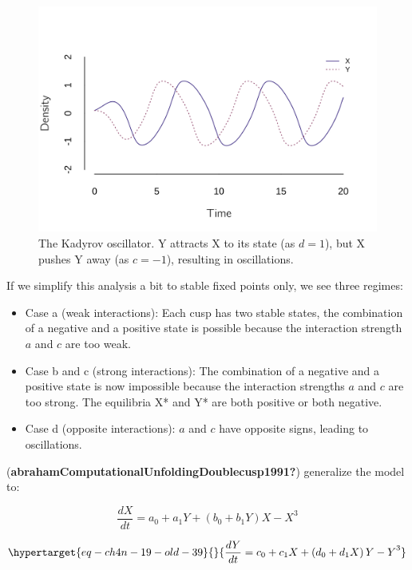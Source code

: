 \documentclass[
  a4paper,
  DIV=11,
  numbers=noendperiod,
  oneside]{scrreprt}
\begin{document}
\begin{figure}

{\centering \includegraphics{media/ch4n/fig-ch4n-img17-old-65.png}

}

\caption{\label{fig-ch4n-img17-old-65}The Kadyrov oscillator. Y attracts
X to its state (as \(d = 1\)), but X pushes Y away (as \(c = - 1\)),
resulting in oscillations.}

\end{figure}

If we simplify this analysis a bit to stable fixed points only, we see
three regimes:

\begin{itemize}
\item
  Case a (weak interactions): Each cusp has two stable states, the
  combination of a negative and a positive state is possible because the
  interaction strength \(a\) and \(c\) are too weak.
\item
  Case b and c (strong interactions): The combination of a negative and
  a positive state is now impossible because the interaction strengths
  \(a\) and \(c\) are too strong. The equilibria X* and Y* are both
  positive or both negative.
\item
  Case d (opposite interactions): \(a\) and \(c\) have opposite signs,
  leading to oscillations.
\end{itemize}

(\textbf{abrahamComputationalUnfoldingDoublecusp1991?}) generalize the
model to:

\[\frac{dX}{dt} = {a_{0} + a_{1}Y + (b_{0} + b_{1}Y)X - X}^{3}\]

\begin{equation}\protect\hypertarget{eq-ch4n-19-old-39}{}{
\frac{dY}{dt} = {c_{0} + c_{1}X + \left( d_{0} + d_{1}X \right)Y - Y}^{3}
}\label{eq-ch4n-19-old-39}\end{equation}
\end{document}

